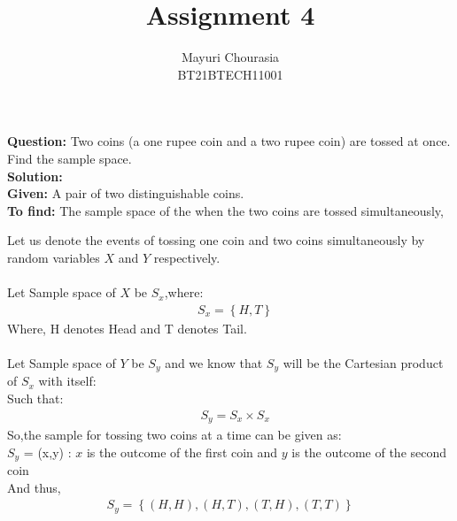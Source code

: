\documentclass[journal,12pt,twocolumn]{IEEEtran}
\title{Assignment 4}
\author{Mayuri Chourasia\\BT21BTECH11001}
\date{}
\providecommand{\cbrak}[1]{\ensuremath{\left\{#1\right\}}}
\newcommand{\question}{\noindent \textbf{Question: }}
\newcommand{\solution}{\noindent \textbf{Solution: }}
\newcommand{\tofind}{\noindent \textbf{To find: }}
\newcommand{\given}{\noindent \textbf{Given: }}
\begin{document}
\maketitle
\question Two coins (a one rupee coin and a two rupee coin) are tossed at once. Find the sample space.\\

\solution \\

\given A pair of two distinguishable coins.\\

\tofind The sample space of the when the two coins are tossed simultaneously,

Let us denote the events of tossing one coin and two coins  simultaneously by random variables $X$ and $Y$ respectively.\\
\\
Let Sample space of $X$ be $S_x$,where:
\begin{align}
    &S_x=\cbrak{H,T}
\end{align}
Where, H denotes Head and T denotes Tail.\\
\\
Let Sample space of $Y$ be $S_y$ and we know that $S_y$ will be the Cartesian product of $S_x$ with itself:\\
Such that:
\begin{align}
    &S_y = S_x \times S_x
\end{align}
So,the sample for tossing two coins at a time can be given as:\\ 
$S_y$ = {(x,y) : $x$ is the outcome of the first coin and $y$ is the outcome of the second coin}\\
And thus,
\begin{align}
    S_y = \cbrak{(H,H),(H,T),(T,H),(T,T)}
\end{align}
\end{document}
